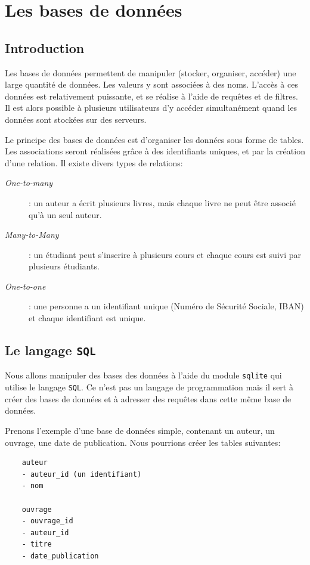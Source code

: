 \documentclass[a4paper,12pt]{book}
\begin{document}
\chapter{Les bases de données}
\section{Introduction}
Les bases de données permettent de manipuler (stocker, organiser, accéder) une large quantité de données. Les valeurs y sont associées à des noms. L'accès à ces données est relativement puissante, et se réalise à l'aide de requêtes et de filtres. Il est alors possible à plusieurs utilisateurs d'y accéder simultanément quand les données sont stockées sur des serveurs.
\medskip

Le principe des bases de données est d'organiser les données sous forme de tables. Les associations seront réalisées grâce à des identifiants uniques, et par la création d'une relation. Il existe divers types de relations:
\begin{description}
	\item[\textit{One-to-many}]: un auteur a écrit plusieurs livres, mais chaque livre ne peut être associé qu'à un seul auteur.
	\item[\textit{Many-to-Many}]: un étudiant peut s'inscrire à plusieurs cours et chaque cours est suivi par plusieurs étudiants.
	\item[\textit{One-to-one}]: une personne a un identifiant unique (Numéro de Sécurité Sociale, IBAN) et chaque identifiant est unique.
\end{description}
\medskip

\section{Le langage \texttt{SQL}}
Nous allons manipuler des bases des données à l'aide du module \texttt{sqlite} qui utilise le langage \texttt{SQL}. Ce n'est pas un langage de programmation mais il sert à créer des bases de données et à adresser des requêtes dans cette même base de données.
\medskip

Prenons l'exemple d'une base de données simple, contenant un auteur, un ouvrage, une date de publication. Nous pourrions créer les tables suivantes:
\begin{verbatim}
    auteur
    - auteur_id (un identifiant)
    - nom

    ouvrage
    - ouvrage_id
    - auteur_id
    - titre
    - date_publication
\end{verbatim}
\medskip
\end{document}
